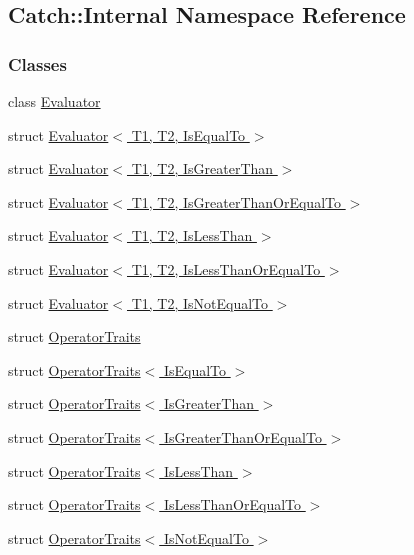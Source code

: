 \hypertarget{a00120}{}\subsection{Catch\+:\+:Internal Namespace Reference}
\label{a00120}
\subsubsection*{Classes}
\begin{DoxyCompactItemize}
\item 
class \hyperlink{a00018}{Evaluator}
\item 
struct \hyperlink{a00019}{Evaluator$<$ T1, T2, Is\+Equal\+To $>$}
\item 
struct \hyperlink{a00020}{Evaluator$<$ T1, T2, Is\+Greater\+Than $>$}
\item 
struct \hyperlink{a00021}{Evaluator$<$ T1, T2, Is\+Greater\+Than\+Or\+Equal\+To $>$}
\item 
struct \hyperlink{a00022}{Evaluator$<$ T1, T2, Is\+Less\+Than $>$}
\item 
struct \hyperlink{a00023}{Evaluator$<$ T1, T2, Is\+Less\+Than\+Or\+Equal\+To $>$}
\item 
struct \hyperlink{a00024}{Evaluator$<$ T1, T2, Is\+Not\+Equal\+To $>$}
\item 
struct \hyperlink{a00056}{Operator\+Traits}
\item 
struct \hyperlink{a00057}{Operator\+Traits$<$ Is\+Equal\+To $>$}
\item 
struct \hyperlink{a00058}{Operator\+Traits$<$ Is\+Greater\+Than $>$}
\item 
struct \hyperlink{a00059}{Operator\+Traits$<$ Is\+Greater\+Than\+Or\+Equal\+To $>$}
\item 
struct \hyperlink{a00060}{Operator\+Traits$<$ Is\+Less\+Than $>$}
\item 
struct \hyperlink{a00061}{Operator\+Traits$<$ Is\+Less\+Than\+Or\+Equal\+To $>$}
\item 
struct \hyperlink{a00062}{Operator\+Traits$<$ Is\+Not\+Equal\+To $>$}
\end{DoxyCompactItemize}
